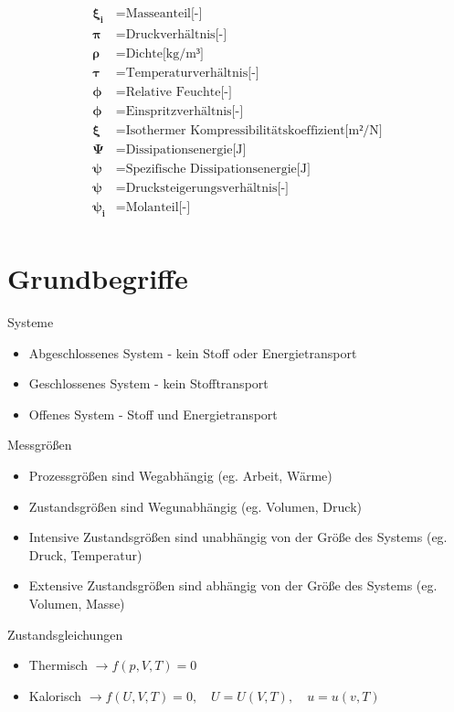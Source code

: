 \documentclass[twocolumn]{article}
\begin{document}
\begin{align*}
	\mathbf{\xi_i}		&=	\text{Masseanteil[-]} \\
	\mathbf{\pi}		&=	\text{Druckverhältnis[-]} \\
	\mathbf{\rho}		&=	\text{Dichte[kg/m³]} \\
	\mathbf{\tau}		&=	\text{Temperaturverhältnis[-]} \\
	\mathbf{\phi}		&=	\text{Relative Feuchte[-]} \\
	\mathbf{\phi}		&=	\text{Einspritzverhältnis[-]} \\
	\mathbf{\xi}		&=	\text{Isothermer Kompressibilitätskoeffizient[m²/N]} \\
	\mathbf{\Psi}		&=	\text{Dissipationsenergie[J]} \\
	\mathbf{\psi}		&=	\text{Spezifische Dissipationsenergie[J]} \\
	\mathbf{\psi}		&=	\text{Drucksteigerungsverhältnis[-]} \\
	\mathbf{\psi_i}		&=	\text{Molanteil[-]} \\
\end{align*}

\pagebreak

\section{Grundbegriffe}

Systeme 
\begin{itemize}

	\item Abgeschlossenes System - kein Stoff oder Energietransport
	\item Geschlossenes System - kein Stofftransport
	\item Offenes System - Stoff und Energietransport

\end{itemize}
Messgrößen
\begin{itemize}

	\item Prozessgrößen sind Wegabhängig (eg. Arbeit, Wärme)
	\item Zustandsgrößen sind Wegunabhängig (eg. Volumen, Druck)
	\item Intensive Zustandsgrößen sind unabhängig von der Größe des Systems (eg. Druck, Temperatur)
	\item Extensive Zustandsgrößen sind abhängig von der Größe des Systems (eg. Volumen, Masse)
\end{itemize}
Zustandsgleichungen
\begin{itemize}
	\item Thermisch $\rightarrow f(p, V, T) = 0$ 
	\item Kalorisch $\rightarrow f(U, V, T) = 0, \quad  U = U(V,T), \quad u = u(v,T)$ 
\end{itemize}
\end{document}

